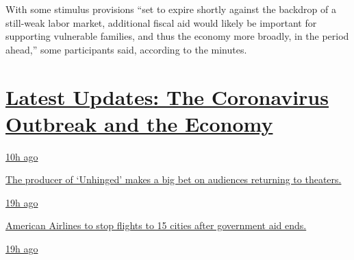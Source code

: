 With some stimulus provisions ``set to expire shortly against the
backdrop of a still-weak labor market, additional fiscal aid would
likely be important for supporting vulnerable families, and thus the
economy more broadly, in the period ahead,'' some participants said,
according to the minutes.

\hypertarget{latest-updates-the-coronavirus-outbreak-and-the-economy}{%
\section{\texorpdfstring{\href{https://www.nytimes3xbfgragh.onion/live/2020/08/20/business/stock-market-today-coronavirus?action=click\&pgtype=Article\&state=default\&region=MAIN_CONTENT_1\&context=storylines_live_updates}{Latest
Updates: The Coronavirus Outbreak and the
Economy}}{Latest Updates: The Coronavirus Outbreak and the Economy}}\label{latest-updates-the-coronavirus-outbreak-and-the-economy}}

\href{https://www.nytimes3xbfgragh.onion/live/2020/08/20/business/stock-market-today-coronavirus?action=click\&pgtype=Article\&state=default\&region=MAIN_CONTENT_1\&context=storylines_live_updates\#the-producer-of-unhinged-makes-a-big-bet-on-audiences-returning-to-theaters}{10h
ago}

\href{https://www.nytimes3xbfgragh.onion/live/2020/08/20/business/stock-market-today-coronavirus?action=click\&pgtype=Article\&state=default\&region=MAIN_CONTENT_1\&context=storylines_live_updates\#the-producer-of-unhinged-makes-a-big-bet-on-audiences-returning-to-theaters}{The
producer of `Unhinged' makes a big bet on audiences returning to
theaters.}

\href{https://www.nytimes3xbfgragh.onion/live/2020/08/20/business/stock-market-today-coronavirus?action=click\&pgtype=Article\&state=default\&region=MAIN_CONTENT_1\&context=storylines_live_updates\#american-airlines-to-stop-flights-to-15-cities-after-government-aid-ends}{19h
ago}

\href{https://www.nytimes3xbfgragh.onion/live/2020/08/20/business/stock-market-today-coronavirus?action=click\&pgtype=Article\&state=default\&region=MAIN_CONTENT_1\&context=storylines_live_updates\#american-airlines-to-stop-flights-to-15-cities-after-government-aid-ends}{American
Airlines to stop flights to 15 cities after government aid ends.}

\href{https://www.nytimes3xbfgragh.onion/live/2020/08/20/business/stock-market-today-coronavirus?action=click\&pgtype=Article\&state=default\&region=MAIN_CONTENT_1\&context=storylines_live_updates\#without-school-plays-and-assemblies-a-technicians-livelihood-withers}{19h
ago}

